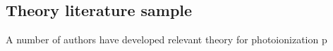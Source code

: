 \subsection{Theory literature sample\label{sec:theory-lit}}

A number of authors have developed relevant theory for photoionization p